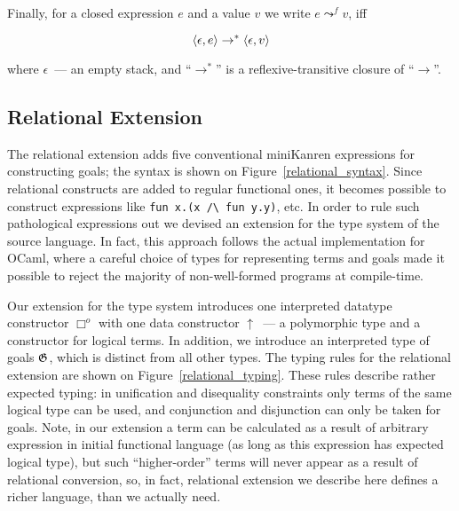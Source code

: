 Finally, for a closed expression $e$ and a value $v$ we write $e \leadsto^f v$, iff 

$$\left<{\epsilon,e}\right>\to^*\left<{\epsilon,v}\right>$$

\noindent where $\epsilon$~--- an empty stack, and ``$\to^*$'' is a reflexive-transitive closure of ``$\to$''. 


\subsection{Relational Extension}
\label{relational_extension}

The relational extension adds five conventional miniKanren expressions for constructing goals; the syntax is shown on Figure~\ref{relational_syntax}.
Since relational constructs are added to regular functional ones, it becomes possible to construct expressions like \lstinline|fun x.(x /\ fun y.y)|, etc.
In order to rule such pathological expressions out we devised an extension for the type system of the source language. In fact, this approach follows the
actual implementation for OCaml, where a careful choice of types for representing terms and goals made it possible to reject the majority of non-well-formed
programs at compile-time.


Our extension for the type system introduces one interpreted datatype constructor $\Box^o$ with one data constructor $\uparrow$~--- a polymorphic type and
a constructor for logical terms. In addition, we introduce an interpreted type of goals $\mathfrak G$, which is distinct from all other types. The typing rules for the relational 
extension are shown on Figure~\ref{relational_typing}. These rules describe rather expected typing: in unification and disequality constraints only
terms of the same logical type can be used, and conjunction and disjunction can only be taken for goals. Note, in our extension a term can be calculated as
a result of arbitrary expression in initial functional language (as long as this expression has expected logical type), but such ``higher-order'' terms will
never appear as a result of relational conversion, so, in fact, relational extension we describe here defines a richer language, than we actually need.

